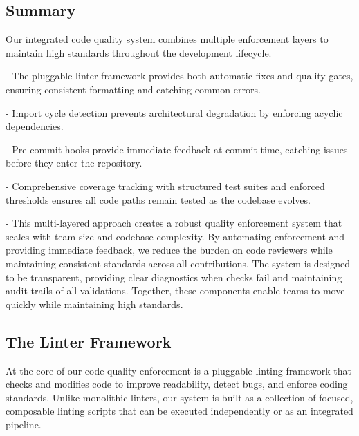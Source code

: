 \subsection{Summary}


Our integrated code quality system combines multiple enforcement layers to
maintain high standards throughout the development lifecycle.

- The pluggable linter framework provides both automatic fixes and quality
  gates, ensuring consistent formatting and catching common errors.

- Import cycle detection prevents architectural degradation by enforcing
  acyclic dependencies.

- Pre-commit hooks provide immediate feedback at commit time, catching issues
  before they enter the repository.

- Comprehensive coverage tracking with structured test suites and
  enforced thresholds ensures all code paths remain tested as the codebase
  evolves.

- This multi-layered
approach creates a robust quality enforcement system that scales with team
size and codebase complexity. By automating enforcement and providing
immediate feedback, we reduce the burden on code reviewers while maintaining
consistent standards across all contributions. The system is designed to
be transparent, providing clear diagnostics when checks fail and maintaining
audit trails of all validations. Together, these components enable teams to
move quickly while maintaining high standards.


\subsection{The Linter Framework}
At the core of our code quality enforcement is a pluggable linting framework
that checks and modifies code to improve readability, detect bugs, and enforce
coding standards. Unlike monolithic linters, our system is built as a
collection of focused, composable linting scripts that can be executed
independently or as an integrated pipeline.

